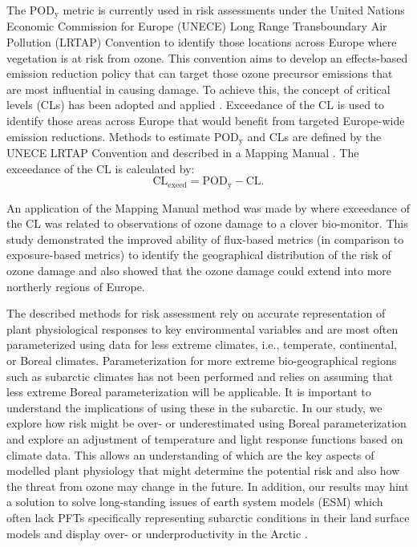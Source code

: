 \documentclass[bg, manuscript]{copernicus}
\begin{document}
The $\mathrm{POD_y}$ metric is currently used in risk assessments under the United Nations Economic Commission for Europe (UNECE) Long Range Transboundary Air Pollution (LRTAP) Convention to identify those locations across Europe where vegetation is at risk from ozone. This convention aims to develop an effects-based emission reduction policy that can target those ozone precursor emissions that are most influential in causing damage. To achieve this, the concept of critical levels (CLs) has been adopted and applied \citep{Maas2016}. Exceedance of the CL is used to identify those areas across Europe that would benefit from targeted Europe-wide emission reductions. Methods to estimate $\mathrm{POD_y}$ and CLs are defined by the UNECE LRTAP Convention and described in a Mapping Manual \citep[most recent version]{ICP:MappingManual2017}. The exceedance of the CL is calculated by: 
%
\begin{equation}
  \mathrm{CL_{exeed}} = \mathrm{POD_y} - \mathrm{CL}.
\end{equation}
%

An application of the Mapping Manual method was made by \citet{GCB:Mills2011} where exceedance of the CL was related to observations of ozone damage to a clover bio-monitor. This study demonstrated the improved ability of flux-based metrics (in comparison to exposure-based metrics) to identify the geographical distribution of the risk of ozone damage and also showed that the ozone damage could extend into more northerly regions of Europe.

The described methods for risk assessment rely on accurate representation of plant physiological responses to key environmental variables and are most often parameterized using data for less extreme climates, i.e., temperate, continental, or Boreal climates. Parameterization for more extreme bio-geographical regions such as subarctic climates has not been performed and relies on assuming that less extreme Boreal parameterization will be applicable. It is important to understand the implications of using these in the subarctic. In our study, we explore how risk might be over- or underestimated using Boreal parameterization and explore an adjustment of temperature and light response functions based on climate data. This allows an understanding of which are the key aspects of modelled plant physiology that might determine the potential risk and also how the threat from ozone may change in the future. In addition, our results may hint a solution to solve long-standing issues of earth system models (ESM) which often lack PFTs specifically representing subarctic conditions in their land surface models and display over- or underproductivity in the Arctic \citep{GMD:Poulter2015,JAMES:Lawrence2019}.\\ 
\end{document}
